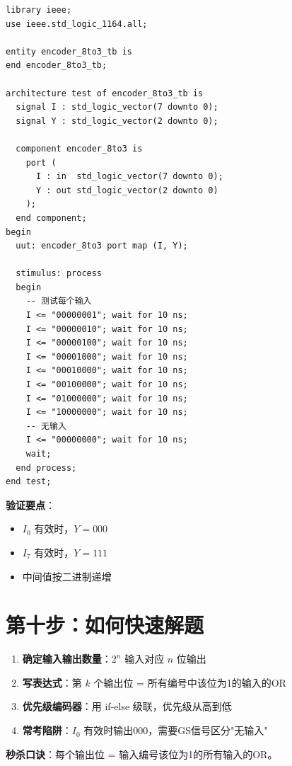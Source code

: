 \begin{lstlisting}[caption={8-3编码器Testbench}]
library ieee;
use ieee.std_logic_1164.all;

entity encoder_8to3_tb is
end encoder_8to3_tb;

architecture test of encoder_8to3_tb is
  signal I : std_logic_vector(7 downto 0);
  signal Y : std_logic_vector(2 downto 0);

  component encoder_8to3 is
    port (
      I : in  std_logic_vector(7 downto 0);
      Y : out std_logic_vector(2 downto 0)
    );
  end component;
begin
  uut: encoder_8to3 port map (I, Y);

  stimulus: process
  begin
    -- 测试每个输入
    I <= "00000001"; wait for 10 ns;
    I <= "00000010"; wait for 10 ns;
    I <= "00000100"; wait for 10 ns;
    I <= "00001000"; wait for 10 ns;
    I <= "00010000"; wait for 10 ns;
    I <= "00100000"; wait for 10 ns;
    I <= "01000000"; wait for 10 ns;
    I <= "10000000"; wait for 10 ns;
    -- 无输入
    I <= "00000000"; wait for 10 ns;
    wait;
  end process;
end test;
\end{lstlisting}

\textbf{验证要点}：
\begin{itemize}
  \item $I_0$ 有效时，$Y = 000$
  \item $I_7$ 有效时，$Y = 111$
  \item 中间值按二进制递增
\end{itemize}

\section{第十步：如何快速解题}

\begin{examtip}[编码器快速解题法]
\begin{enumerate}
  \item \textbf{确定输入输出数量}：$2^n$ 输入对应 $n$ 位输出
  \item \textbf{写表达式}：第 $k$ 个输出位 = 所有编号中该位为1的输入的OR
  \item \textbf{优先级编码器}：用 if-else 级联，优先级从高到低
  \item \textbf{常考陷阱}：$I_0$ 有效时输出000，需要GS信号区分"无输入"
\end{enumerate}
\end{examtip}

\textbf{秒杀口诀}：每个输出位 = 输入编号该位为1的所有输入的OR。

